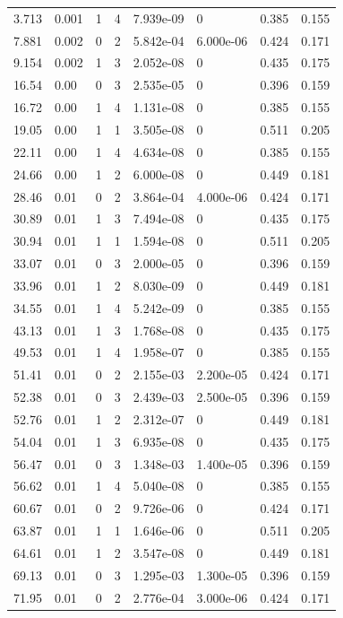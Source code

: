 \documentclass[preview]{standalone}
\begin{document}
{{\begin{tabular}{L{1.2cm}C{1.2cm} C{0.3cm}C{0.5cm} C{1.4cm}C{1.4cm} C{1.4cm}C{1.4cm}}
  3.713  &  0.001  & 1     &  4 &  7.939e-09  & 0  & 0.385 &  0.155   \\ 
  7.881  &  0.002  & 0     &  2 &  5.842e-04  & 6.000e-06  & 0.424 &  0.171   \\ 
  9.154  &  0.002  & 1     &  3 &  2.052e-08  & 0  & 0.435 &  0.175   \\ 
  16.54  &  0.00  & 0     &  3 &  2.535e-05  & 0  & 0.396 &  0.159   \\ 
  16.72  &  0.00  & 1     &  4 &  1.131e-08  & 0  & 0.385 &  0.155   \\ 
  19.05  &  0.00  & 1     &  1 &  3.505e-08  & 0  & 0.511 &  0.205   \\ 
  22.11  &  0.00  & 1     &  4 &  4.634e-08  & 0  & 0.385 &  0.155   \\ 
  24.66  &  0.00  & 1     &  2 &  6.000e-08  & 0  & 0.449 &  0.181   \\ 
  28.46  &  0.01  & 0     &  2 &  3.864e-04  & 4.000e-06  & 0.424 &  0.171   \\ 
  30.89  &  0.01  & 1     &  3 &  7.494e-08  & 0  & 0.435 &  0.175   \\ 
  30.94  &  0.01  & 1     &  1 &  1.594e-08  & 0  & 0.511 &  0.205   \\ 
  33.07  &  0.01  & 0     &  3 &  2.000e-05  & 0  & 0.396 &  0.159   \\ 
  33.96  &  0.01  & 1     &  2 &  8.030e-09  & 0  & 0.449 &  0.181   \\ 
  34.55  &  0.01  & 1     &  4 &  5.242e-09  & 0  & 0.385 &  0.155   \\ 
  43.13  &  0.01  & 1     &  3 &  1.768e-08  & 0  & 0.435 &  0.175   \\ 
  49.53  &  0.01  & 1     &  4 &  1.958e-07  & 0  & 0.385 &  0.155   \\ 
  51.41  &  0.01  & 0     &  2 &  2.155e-03  & 2.200e-05  & 0.424 &  0.171   \\ 
  52.38  &  0.01  & 0     &  3 &  2.439e-03  & 2.500e-05  & 0.396 &  0.159   \\ 
  52.76  &  0.01  & 1     &  2 &  2.312e-07  & 0  & 0.449 &  0.181   \\ 
  54.04  &  0.01  & 1     &  3 &  6.935e-08  & 0  & 0.435 &  0.175   \\ 
  56.47  &  0.01  & 0     &  3 &  1.348e-03  & 1.400e-05  & 0.396 &  0.159   \\ 
  56.62  &  0.01  & 1     &  4 &  5.040e-08  & 0  & 0.385 &  0.155   \\ 
  60.67  &  0.01  & 0     &  2 &  9.726e-06  & 0  & 0.424 &  0.171   \\ 
  63.87  &  0.01  & 1     &  1 &  1.646e-06  & 0  & 0.511 &  0.205   \\ 
  64.61  &  0.01  & 1     &  2 &  3.547e-08  & 0  & 0.449 &  0.181   \\ 
  69.13  &  0.01  & 0     &  3 &  1.295e-03  & 1.300e-05  & 0.396 &  0.159   \\ 
  71.95  &  0.01  & 0     &  2 &  2.776e-04  & 3.000e-06  & 0.424 &  0.171   \\ 
\hline 
\end{tabular} 

}}
\end{document}
